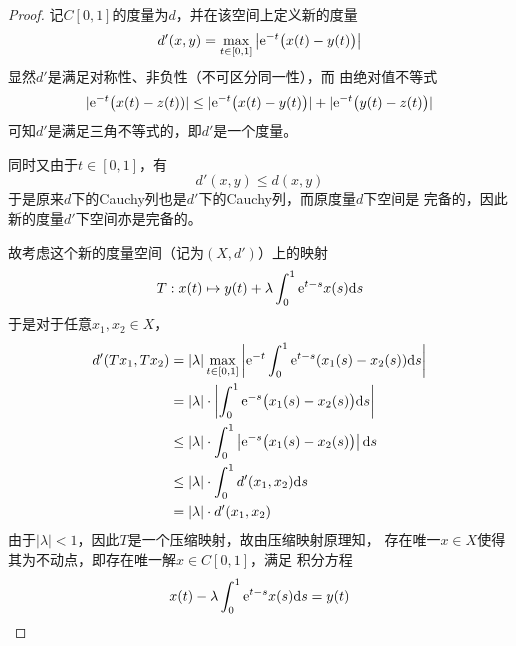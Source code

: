 \documentclass[cn]{homework}
\begin{document}
    \problem
    \begin{proof}
        记$C[0,1]$的度量为$d$，并在该空间上定义新的度量
        \[d'(x,y)=\max_{t\in[0,1]}\left|\mathrm e^{-t}\big(x(t)-y(t)\big)\right|\]
        显然$d'$是满足对称性、非负性（不可区分同一性），而
        由绝对值不等式
        \[|\mathrm e^{-t}\big(x(t)-z(t))|\leq
        |\mathrm e^{-t}\big(x(t)-y(t)\big)|+|\mathrm e^{-t}\big(y(t)-z(t)\big)|\]
        可知$d'$是满足三角不等式的，即$d'$是一个度量。

        同时又由于$t\in[0,1]$，有
        \[d'(x,y)\leq d(x,y)\]
        于是原来$d$下的Cauchy列也是$d'$下的Cauchy列，而原度量$d$下空间是
        完备的，因此新的度量$d'$下空间亦是完备的。

        故考虑这个新的度量空间（记为$(X,d')$）上的映射
        \[T:x(t)\mapsto y(t)+\lambda\int_0^1\mathrm e^{t-s}x(s)\mathrm d s\]
        于是对于任意$x_1,x_2\in X$，
        \[\begin{aligned}
            d'(Tx_1,Tx_2)&=|\lambda|\max_{t\in[0,1]}
            \left|\mathrm e^{-t}\int_0^1\mathrm e^{t-s}(x_1(s)-x_2(s))\mathrm d s\right|\\
            &=|\lambda|\cdot
            \left|\int_0^1\mathrm e^{-s}\big(x_1(s)-x_2(s)\big)\mathrm d s\right|\\
            &\leq|\lambda|\cdot
            \int_0^1\left|\mathrm e^{-s}\big(x_1(s)-x_2(s)\big)\right|\mathrm d s\\
            &\leq|\lambda|\cdot\int_0^1d'(x_1,x_2)\mathrm d s\\
            &=|\lambda|\cdot d'(x_1,x_2)
        \end{aligned}\]
        由于$|\lambda|<1$，因此$T$是一个压缩映射，故由压缩映射原理知，
        存在唯一$x\in X$使得其为不动点，即存在唯一解$x\in C[0,1]$，满足
        积分方程
        \[x(t)-\lambda\int_0^1\mathrm e^{t-s}x(s)\mathrm d s=y(t)\]
    \end{proof}
\end{document}
